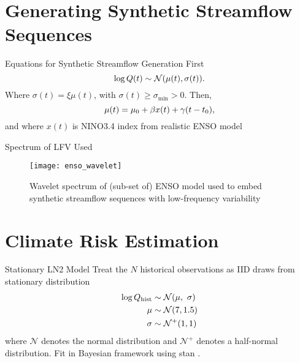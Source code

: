 \documentclass[
  10pt,     %
]{beamer}
\newcommand{\normal}{\mathcal{N}}
\begin{document}

\appendix
\renewcommand{\thefigure}{A\arabic{figure}}
\setcounter{figure}{0}
\renewcommand{\theequation}{A\arabic{equation}}
\setcounter{equation}{0}
\renewcommand{\thetable}{A\arabic{table}}
\setcounter{table}{0}

\section{Generating Synthetic Streamflow Sequences}

\begin{frame}{Equations for Synthetic Streamflow Generation}
  First
  \begin{equation} \label{eq:lognormal}
    \log Q(t) \sim \normal \qty(\mu(t), \sigma(t)).
  \end{equation}
  Where $\sigma(t) = \xi \mu(t)$, with $\sigma(t) \geq \sigma_\text{min} > 0$.
  Then,
  \begin{equation}\label{eq:nino3}
    \mu(t) = \mu_0 + \beta x(t) + \gamma \qty(t - t_0),
  \end{equation}
  and where $x(t)$ is NINO3.4 index from realistic ENSO model \citep{Zebiak:1987cl,Ramesh:2016hf}
\end{frame}

\begin{frame}{Spectrum of LFV Used}
  \begin{figure}
    \texttt{[image: enso\_wavelet]}
    \caption{Wavelet spectrum of (sub-set of) ENSO model used to embed synthetic streamflow sequences with low-frequency variability}
  \end{figure}
\end{frame}

\section{Climate Risk Estimation}

\begin{frame}{Stationary LN2 Model}
  Treat the $N$ historical observations as IID draws from stationary distribution
  \begin{align}\label{eq:ln2-stationary}
    \begin{split}
      \log Q_\text{hist} & \sim \normal \qty(\mu, \ \sigma) \\
      \mu &\sim \normal \qty(7, 1.5) \\
      \sigma &\sim \normal^+ \qty(1, 1)
    \end{split}
  \end{align}
  where $\normal$ denotes the normal distribution and $\normal^+$ denotes a half-normal distribution.
  Fit in Bayesian framework using stan \citep{Carpenter:2017ke}.
\end{frame}
\end{document}
